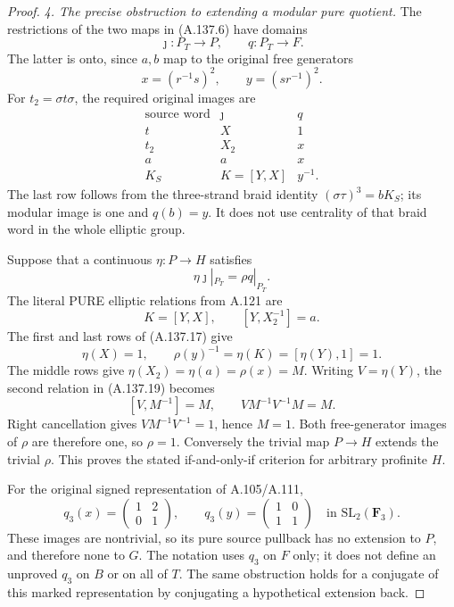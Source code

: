 \begin{proof}
\par\smallskip\noindent
\emph{4. The precise obstruction to extending a modular pure
quotient.}
The restrictions of the two maps in (A.137.6) have domains
\[
 \jmath:P_T\longrightarrow P,\qquad
 q:P_T\longrightarrow F.
\]
The latter is onto, since \(a,b\) map to the original free
generators
\[
 x=(r^{-1}s)^2,\qquad y=(sr^{-1})^2 .
\]
For \(t_2=\sigma t\sigma\), the required original images are
\[
\begin{array}{c|cc}
 \text{source word}&\jmath&q\\\hline
 t&X&1\\
 t_2&X_2&x\\
 a&a&x\\
 K_S&K=[Y,X]&y^{-1}.
\end{array}
\tag{A.137.17}
\]
The last row follows from the three-strand braid identity
\((\sigma\tau)^3=bK_S\); its modular image is one and
\(q(b)=y\). It does not use centrality of that braid word
in the whole elliptic group.

Suppose that a continuous \(\eta:P\to H\) satisfies
\[
 \eta\jmath|_{P_T}=\rho q|_{P_T}.
\tag{A.137.18}
\]
The literal PURE elliptic relations from A.121 are
\[
 K=[Y,X],\qquad [Y,X_2^{-1}]=a .
\tag{A.137.19}
\]
The first and last rows of (A.137.17) give
\[
 \eta(X)=1,\qquad
 \rho(y)^{-1}=\eta(K)=[\eta(Y),1]=1.
\]
The middle rows give
\(\eta(X_2)=\eta(a)=\rho(x)=M\).
Writing \(V=\eta(Y)\), the second relation in (A.137.19)
becomes
\[
 [V,M^{-1}]=M,\qquad VM^{-1}V^{-1}M=M .
\]
Right cancellation gives \(VM^{-1}V^{-1}=1\), hence \(M=1\).
Both free-generator images of \(\rho\) are therefore one,
so \(\rho=1\). Conversely the trivial map \(P\to H\)
extends the trivial \(\rho\). This proves the stated
if-and-only-if criterion for arbitrary profinite \(H\).

For the original signed representation of A.105/A.111,
\[
 q_3(x)=\begin{pmatrix}1&2\\0&1\end{pmatrix},
 \qquad
 q_3(y)=\begin{pmatrix}1&0\\1&1\end{pmatrix}
 \quad\text{in }\mathrm{SL}_2(\mathbf F_3).
\tag{A.137.20}
\]
These images are nontrivial, so its pure source pullback has
no extension to \(P\), and therefore none to \(G\).
The notation uses \(q_3\) on \(F\) only; it does not define
an unproved \(q_3\) on \(B\) or on all of \(T\).
The same obstruction holds for a conjugate of this marked
representation by conjugating a hypothetical extension back.
\end{proof}

